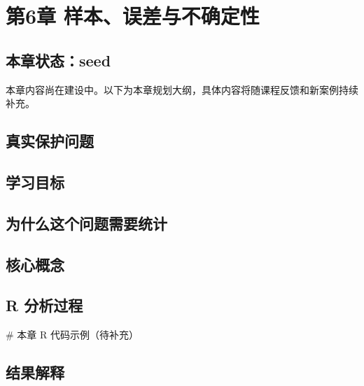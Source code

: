 \documentclass[
  letterpaper,
]{scrbook}
\newenvironment{Shaded}{\begin{snugshade}}{\end{snugshade}}
\newcommand{\CommentTok}[1]{\textcolor[rgb]{0.37,0.37,0.37}{#1}}
\begin{document}
\chapter{第6章
样本、误差与不确定性}\label{ux7b2c6ux7ae0-ux6837ux672cux8befux5deeux4e0eux4e0dux786eux5b9aux6027-1}

\section{本章状态：seed}\label{ux672cux7ae0ux72b6ux6001seed-1}

本章内容尚在建设中。以下为本章规划大纲，具体内容将随课程反馈和新案例持续补充。

\section{真实保护问题}\label{ux771fux5b9eux4fddux62a4ux95eeux9898-4}

\section{学习目标}\label{ux5b66ux4e60ux76eeux6807-4}

\section{为什么这个问题需要统计}\label{ux4e3aux4ec0ux4e48ux8fd9ux4e2aux95eeux9898ux9700ux8981ux7edfux8ba1-1}

\section{核心概念}\label{ux6838ux5fc3ux6982ux5ff5-1}

\section{R 分析过程}\label{r-ux5206ux6790ux8fc7ux7a0b-2}

\begin{Shaded}
\begin{Highlighting}[]
\CommentTok{\# 本章 R 代码示例（待补充）}
\end{Highlighting}
\end{Shaded}

\section{结果解释}\label{ux7ed3ux679cux89e3ux91ca-1}
\end{document}
